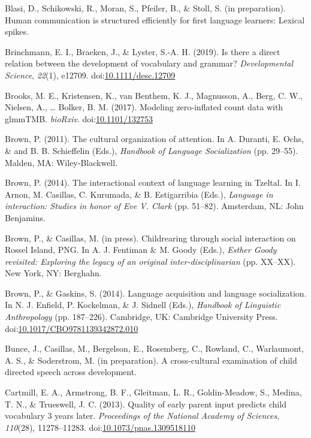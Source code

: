 \documentclass[,man,floatsintext]{apa6}
\begin{document}
\hypertarget{ref-blasiIPhuman}{}
Blasi, D., Schikowski, R., Moran, S., Pfeiler, B., \& Stoll, S. (in
preparation). Human communication is structured efficiently for first
language learners: Lexical spikes.

\hypertarget{ref-brinchmann2019direct}{}
Brinchmann, E. I., Braeken, J., \& Lyster, S.-A. H. (2019). Is there a
direct relation between the development of vocabulary and grammar?
\emph{Developmental Science}, \emph{22}(1), e12709.
doi:\href{https://doi.org/10.1111/desc.12709}{10.1111/desc.12709}

\hypertarget{ref-brooks2017modeling}{}
Brooks, M. E., Kristensen, K., van Benthem, K. J., Magnusson, A., Berg,
C. W., Nielsen, A., \ldots{} Bolker, B. M. (2017). Modeling
zero-inflated count data with glmmTMB. \emph{bioRxiv}.
doi:\href{https://doi.org/10.1101/132753}{10.1101/132753}

\hypertarget{ref-brown2011cultural}{}
Brown, P. (2011). The cultural organization of attention. In A. Duranti,
E. Ochs, \& and B. B. Schieffelin (Eds.), \emph{Handbook of Language
Socialization} (pp. 29--55). Malden, MA: Wiley-Blackwell.

\hypertarget{ref-brown2014interactional}{}
Brown, P. (2014). The interactional context of language learning in
Tzeltal. In I. Arnon, M. Casillas, C. Kurumada, \& B. Estigarribia
(Eds.), \emph{Language in interaction: Studies in honor of Eve V. Clark}
(pp. 51--82). Amsterdam, NL: John Benjamins.

\hypertarget{ref-brownIPchildrearing}{}
Brown, P., \& Casillas, M. (in press). Childrearing through social
interaction on Rossel Island, PNG. In A. J. Fentiman \& M. Goody (Eds.),
\emph{Esther Goody revisited: Exploring the legacy of an original
inter-disciplinarian} (pp. XX--XX). New York, NY: Berghahn.

\hypertarget{ref-brown2014language}{}
Brown, P., \& Gaskins, S. (2014). Language acquisition and language
socialization. In N. J. Enfield, P. Kockelman, \& J. Sidnell (Eds.),
\emph{Handbook of Linguistic Anthropology} (pp. 187--226). Cambridge,
UK: Cambridge University Press.
doi:\href{https://doi.org/10.1017/CBO9781139342872.010}{10.1017/CBO9781139342872.010}

\hypertarget{ref-bunceIPCDS}{}
Bunce, J., Casillas, M., Bergelson, E., Rosemberg, C., Rowland, C.,
Warlaumont, A. S., \& Soderstrom, M. (in preparation). A cross-cultural
examination of child directed speech across development.

\hypertarget{ref-cartmill2013quality}{}
Cartmill, E. A., Armstrong, B. F., Gleitman, L. R., Goldin-Meadow, S.,
Medina, T. N., \& Trueswell, J. C. (2013). Quality of early parent input
predicts child vocabulary 3 years later. \emph{Proceedings of the
National Academy of Sciences}, \emph{110}(28), 11278--11283.
doi:\href{https://doi.org/10.1073/pnas.1309518110}{10.1073/pnas.1309518110}
\end{document}
